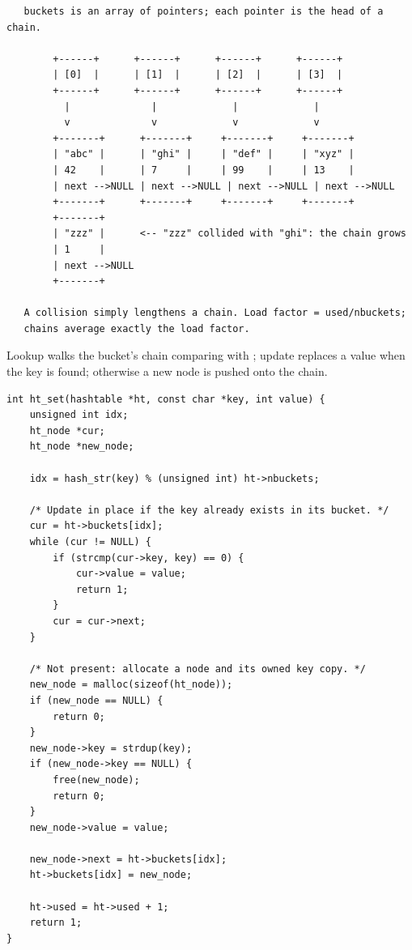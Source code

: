 \begin{verbatim}
   buckets is an array of pointers; each pointer is the head of a chain.

        +------+      +------+      +------+      +------+
        | [0]  |      | [1]  |      | [2]  |      | [3]  |
        +------+      +------+      +------+      +------+
          |              |             |             |
          v              v             v             v
        +-------+      +-------+     +-------+     +-------+
        | "abc" |      | "ghi" |     | "def" |     | "xyz" |
        | 42    |      | 7     |     | 99    |     | 13    |
        | next -->NULL | next -->NULL | next -->NULL | next -->NULL
        +-------+      +-------+     +-------+     +-------+
        +-------+
        | "zzz" |      <-- "zzz" collided with "ghi": the chain grows
        | 1     |
        | next -->NULL
        +-------+

   A collision simply lengthens a chain. Load factor = used/nbuckets;
   chains average exactly the load factor.
\end{verbatim}

Lookup walks the bucket's chain comparing with ; update
replaces a value when the key is found; otherwise a new node is pushed
onto the chain.

\begin{lstlisting}[caption={Insert or update. Returns 1 on success.}]
int ht_set(hashtable *ht, const char *key, int value) {
    unsigned int idx;
    ht_node *cur;
    ht_node *new_node;

    idx = hash_str(key) % (unsigned int) ht->nbuckets;

    /* Update in place if the key already exists in its bucket. */
    cur = ht->buckets[idx];
    while (cur != NULL) {
        if (strcmp(cur->key, key) == 0) {
            cur->value = value;
            return 1;
        }
        cur = cur->next;
    }

    /* Not present: allocate a node and its owned key copy. */
    new_node = malloc(sizeof(ht_node));
    if (new_node == NULL) {
        return 0;
    }
    new_node->key = strdup(key);
    if (new_node->key == NULL) {
        free(new_node);
        return 0;
    }
    new_node->value = value;

    new_node->next = ht->buckets[idx];
    ht->buckets[idx] = new_node;

    ht->used = ht->used + 1;
    return 1;
}
\end{lstlisting}

